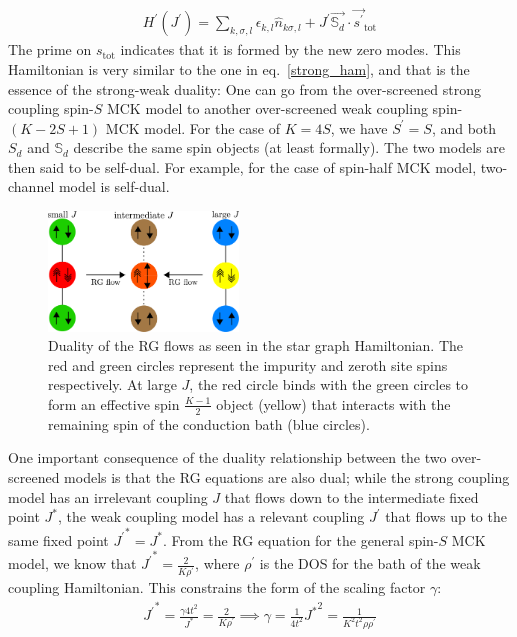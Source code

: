 \documentclass[reprint,prb,superscriptaddress]{revtex4-2}
\begin{document}
\begin{equation}\begin{aligned}
	H^\prime(J^\prime) = \sum_{k,\sigma,l}\epsilon_{k,l} \hat n_{k\sigma,l} + J^\prime \vec{\mathbb{S}_d}\cdot\vec{s^\prime}_\text{tot}
\end{aligned}\end{equation}
The prime on \(s_\text{tot}\) indicates that it is formed by the new zero modes. This Hamiltonian is very similar to the one in eq.~\ref{strong_ham}, and that is the essence of the strong-weak duality: One can go from the over-screened strong coupling spin-\(S\) MCK model to another over-screened weak coupling spin-\((K-2S+1)\) MCK model. For the case of \(K=4S\), we have \(S^\prime = S\), and both \(S_d\) and \(\mathbb{S}_d\) describe the same spin objects (at least formally). The two models are then said to be self-dual. For example, for the case of spin-half MCK model, two-channel model is self-dual.
\begin{figure}[!htpb]
	\centering
	\includegraphics[width=0.45\textwidth]{./duality.pdf}
	\caption{Duality of the RG flows as seen in the star graph Hamiltonian. The red and green circles represent the impurity and zeroth site spins respectively. At large \(J\), the red circle binds with the green circles to form an effective spin \(\frac{K-1}{2}\) object (yellow) that interacts with the remaining spin of the conduction bath (blue circles).}
	\label{duality_fig}
\end{figure}

One important consequence of the duality relationship between the two over-screened models is that the RG equations are also dual; while the strong coupling model has an irrelevant coupling \(J\) that flows down to the intermediate fixed point \(J^*\), the weak coupling model has a relevant coupling \(J^\prime\) that flows up to the same fixed point \({J^\prime}^* = J^*\). From the RG equation for the general spin-\(S\) MCK model, we know that \({J^\prime}^* = \frac{2}{K \rho^\prime}\), where \(\rho^\prime\) is the DOS for the bath of the weak coupling Hamiltonian. This constrains the form of the scaling factor \(\gamma\):
\begin{equation}\begin{aligned}
	{J^\prime}^* = \frac{\gamma 4t^2}{J^*} = \frac{2}{K \rho^\prime} \implies \gamma = \frac{1}{4t^2} {J^*}^2 = \frac{1}{K^2 t^2 \rho \rho^\prime}
\end{aligned}\end{equation}
\end{document}
